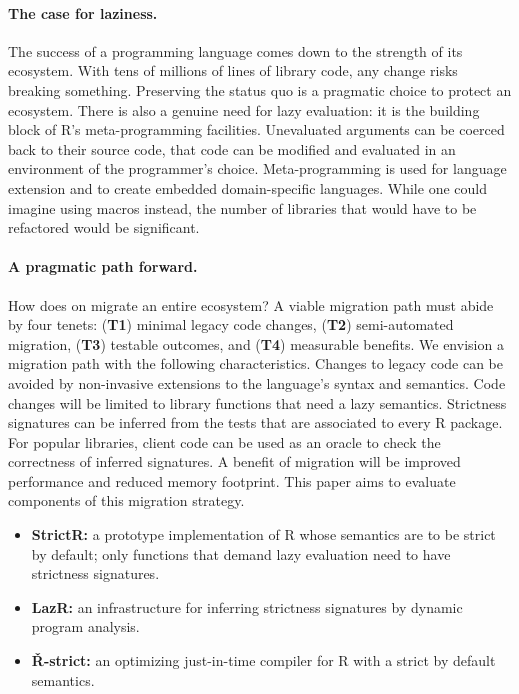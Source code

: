 \documentclass[review,creen,acmsmall]{acmart}
\begin{document}
\paragraph{The case for laziness.} The success of a programming language
comes down to the strength of its ecosystem. With tens of millions of lines of
library code, any change risks breaking something. Preserving the status quo is
a pragmatic choice to protect an ecosystem. There is also a genuine need for
lazy evaluation: it is the building block of R's meta-programming facilities.
Unevaluated arguments can be coerced back to their source code, that code can be
modified and evaluated in an environment of the programmer's choice.
Meta-programming is used for language extension and to create embedded
domain-specific languages. While one could imagine using macros instead, the
number of libraries that would have to be refactored would be significant.

\paragraph{A pragmatic path forward.} How does on migrate an entire ecosystem?
A viable migration path must abide by four tenets: ({\bf T1}) minimal legacy
code changes, ({\bf T2}) semi-automated migration, ({\bf T3}) testable outcomes,
and ({\bf T4}) measurable benefits. We envision a migration path with the
following characteristics. Changes to legacy code can be avoided by non-invasive
extensions to the language's syntax and semantics. Code changes will be limited
to library functions that need a lazy semantics. Strictness signatures can be
inferred from the tests that are associated to every R package. For popular
libraries, client code can be used as an oracle to check the correctness of
inferred signatures. A benefit of migration will be improved performance and
reduced memory footprint. This paper aims to evaluate components of this
migration strategy.

\begin{itemize}[---]
\item {\bf StrictR:} a prototype implementation of R whose semantics are to be
  strict by default; only functions that demand lazy evaluation need to have
  strictness signatures.
\item {\bf LazR:} an infrastructure for inferring strictness signatures by
  dynamic program analysis.
\item {\bf \v R-strict:} an optimizing just-in-time compiler for R with a strict
  by default semantics.
\end{itemize}
\end{document}
